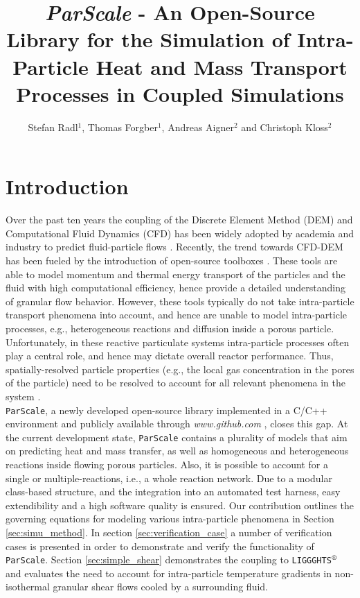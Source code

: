 \documentclass{particles2015}
\title{\textit{ParScale} - An Open-Source Library for the Simulation of Intra-Particle Heat and Mass Transport Processes in Coupled Simulations}
\author{Stefan Radl$^{1}$, Thomas Forgber$^{1}$, Andreas Aigner$^{2}$ and Christoph Kloss$^{2}$}
\begin{document}
\maketitle
\thispagestyle{empty}

\section{Introduction}
\label{sec:introduction}
Over the past ten years the coupling of the Discrete Element Method (DEM) and Computational Fluid Dynamics (CFD)  has been widely adopted by academia and industry to predict fluid-particle flows \cite{Wu2014}. Recently, the trend towards CFD-DEM has been fueled by the introduction of open-source toolboxes \cite{Kloss2012}. These tools are able to model momentum and thermal energy transport of the particles and the fluid with high computational efficiency, hence provide a detailed understanding of granular flow behavior. However, these tools typically do not take intra-particle transport phenomena into account, and hence are unable to model intra-particle processes, e.g., heterogeneous reactions and diffusion inside a porous particle. Unfortunately, in these reactive particulate systems intra-particle processes often play a central role, and hence may dictate overall reactor performance. Thus, spatially-resolved particle properties (e.g., the local gas concentration in the pores of the particle) need to be resolved to account for all relevant phenomena in the system \cite{Dixon2007}. \\
\texttt{ParScale}, a newly developed open-source library implemented in a C/C++ environment and publicly available through \textit{www.github.com} \cite{ParScale_Public}, closes this gap. At the current development state, \texttt{ParScale} contains a plurality of models that aim on predicting heat and mass transfer, as well as homogeneous and heterogeneous reactions inside flowing porous particles. Also, it is possible to account for a single or multiple-reactions, i.e., a whole reaction network. Due to a modular class-based structure, and the integration into an automated test harness, easy extendibility and a high software quality is ensured. Our contribution outlines the governing equations for modeling various intra-particle phenomena in Section \ref{sec:simu_method}. In section \ref{sec:verification_case} a number of verification cases is presented in order to demonstrate and verify the functionality of \texttt{ParScale}. Section \ref{sec:simple_shear} demonstrates the coupling to \texttt{LIGGGHTS}$\textsuperscript{\textregistered}$ and evaluates the need to account for intra-particle temperature gradients in non-isothermal granular shear flows cooled by a surrounding fluid.  
\end{document}
